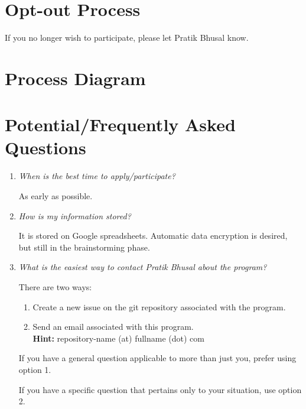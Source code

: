\documentclass[letterpaper, 12pt]{article}
\newcommand{\QA}[2]{\textit{#1}\medskip

    #2\bigskip
}
\begin{document}
\section{Opt-out Process}

If you no longer wish to participate, please let Pratik Bhusal know.

\section{Process Diagram}

\begin{center}
    \label{fig:process}
\end{center}

\section{Potential/Frequently Asked Questions}

\begin{enumerate}[leftmargin=*]
    \item\QA%
        {When is the best time to apply/participate?}
        {As early as possible.}
    \item\QA%
        {How is my information stored?}
        {%
            It is stored on Google spreadsheets. Automatic data encryption is
            desired, but still in the brainstorming phase.
        }
    \item\QA%
        {What is the easiest way to contact Pratik Bhusal about the program?}
        {%
            There are two ways:

            \begin{enumerate}
                \item Create a new issue on the git repository associated with
                    the program.
                \item Send an email associated with this
                    program.\\\textbf{Hint:} repository-name (at) fullname (dot) com

            \end{enumerate}

            If you have a general question applicable to more than just you,
            prefer using option 1.

            If you have a specific question that pertains only to your
            situation, use option 2.
        }
\end{enumerate}
\end{document}
